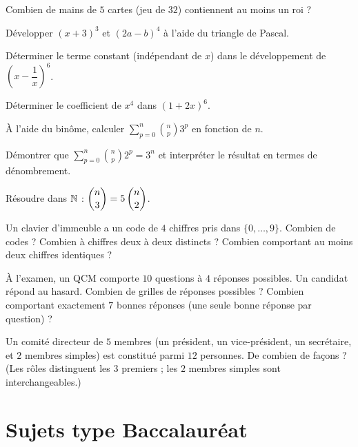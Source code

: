 \exo{} Combien de \og mains \fg{} de $5$ cartes (jeu de $32$) contiennent au moins
un roi ?

\exo{} Développer $(x+3)^{3}$ et $(2a-b)^{4}$ à l'aide du triangle de Pascal.

\exo{} Déterminer le terme constant (indépendant de $x$) dans le développement de
$\left(x-\dfrac{1}{x}\right)^{6}$.

\exo{} Déterminer le coefficient de $x^{4}$ dans $(1+2x)^{6}$.

\exo{} À l'aide du binôme, calculer $\displaystyle\sum_{p=0}^{n}\binom np 3^{p}$
en fonction de $n$.

\exo{} Démontrer que $\displaystyle\sum_{p=0}^{n}\binom np 2^{p}=3^{n}$ et
interpréter le résultat en termes de dénombrement.

\exo{} Résoudre dans $\mathbb{N}$ : $\dbinom n3=5\,\dbinom n2$.

\exo{} Un clavier d'immeuble a un code de $4$ chiffres pris dans $\{0,\dots,9\}$.
Combien de codes ? Combien à chiffres deux à deux distincts ? Combien comportant au moins
deux chiffres identiques ?

\exo{} À l'examen, un QCM comporte $10$ questions à $4$ réponses possibles. Un
candidat répond au hasard. Combien de grilles de réponses possibles ? Combien comportant
exactement $7$ bonnes réponses (une seule bonne réponse par question) ?

\exo{} Un comité directeur de $5$ membres (un président, un vice-président, un
secrétaire, et $2$ membres simples) est constitué parmi $12$ personnes. De combien de
façons ? (Les rôles distinguent les $3$ premiers ; les $2$ membres simples sont
interchangeables.)

\section{Sujets type Baccalauréat}

